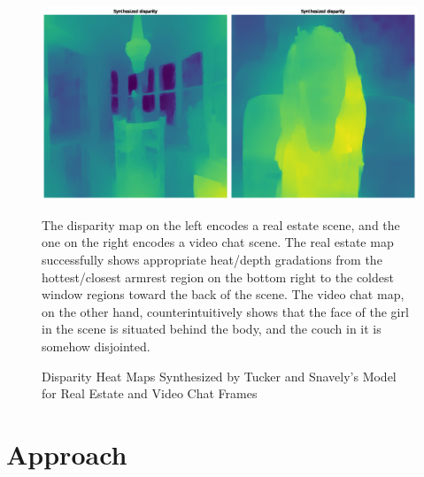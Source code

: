 \begin{figure}[!h]
    \includegraphics[width=1\columnwidth]{figures/great-off-kilter-disparity.png}
    \caption{Disparity Heat Maps Synthesized by Tucker and Snavely's Model~\cite{single_view_mpi} for Real Estate and Video Chat Frames}
    \label{fig:great-off-kilter-disparity}
    {\small The disparity map on the left encodes a real estate scene, and the one on the right encodes a video chat scene. The real estate map successfully shows appropriate heat/depth gradations from the hottest/closest armrest region on the bottom right to the coldest window regions toward the back of the scene. The video chat map, on the other hand, counterintuitively shows that the face of the girl in the scene is situated behind the body, and the couch in it is somehow disjointed.}  
\end{figure}

\section{Approach}\label{sec:approach} 

